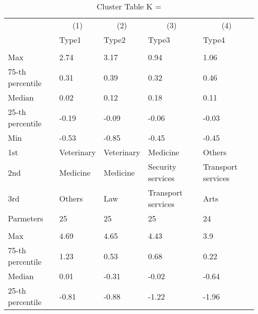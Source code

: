 \begin{table}
\centering
\caption{Cluster Table K = }
\centering
\begin{threeparttable}
\begin{tabular}[t]{lllll}
\toprule
\multicolumn{1}{c}{ } & \multicolumn{1}{c}{(1)} & \multicolumn{1}{c}{(2)} & \multicolumn{1}{c}{(3)} & \multicolumn{1}{c}{(4)} \\
\cmidrule(l{3pt}r{3pt}){2-2} \cmidrule(l{3pt}r{3pt}){3-3} \cmidrule(l{3pt}r{3pt}){4-4} \cmidrule(l{3pt}r{3pt}){5-5}
 & Type1 & Type2 & Type3 & Type4\\
\midrule
\addlinespace[0.3em]
\multicolumn{5}{l}{\textit{\textbf{Panel A: }}}\\
\hspace{1em}Max & 2.74 & 3.17 & 0.94 & 1.06\\
\hspace{1em}75-th percentile & 0.31 & 0.39 & 0.32 & 0.46\\
\hspace{1em}Median & 0.02 & 0.12 & 0.18 & 0.11\\
\hspace{1em}25-th percentile & -0.19 & -0.09 & -0.06 & -0.03\\
\hspace{1em}Min & -0.53 & -0.85 & -0.45 & -0.45\\
\hspace{1em}1st & Veterinary & Veterinary & Medicine & Others\\
\hspace{1em}2nd & Medicine & Medicine & Security services & Transport services\\
\hspace{1em}3rd & Others & Law & Transport services & Arts\\
\hspace{1em}Parmeters & 25 & 25 & 25 & 24\\
\addlinespace[0.3em]
\multicolumn{5}{l}{\textit{\textbf{Panel B: }}}\\
\hspace{1em}Max & 4.69 & 4.65 & 4.43 & 3.9\\
\hspace{1em}75-th percentile & 1.23 & 0.53 & 0.68 & 0.22\\
\hspace{1em}Median & 0.01 & -0.31 & -0.02 & -0.64\\
\hspace{1em}25-th percentile & -0.81 & -0.88 & -1.22 & -1.96\\

\end{tabular}
\end{threeparttable}
\end{table}
